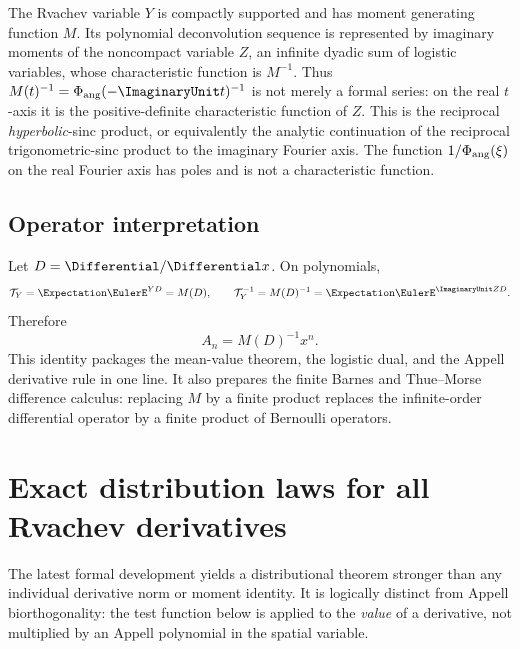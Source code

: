 \begin{resultbox}
The Rvachev variable $Y$ is compactly supported and has moment generating function $M$.  Its
polynomial deconvolution sequence is represented by imaginary moments of the noncompact variable
$Z$, an infinite dyadic sum of logistic variables, whose characteristic function is $M^{-1}$.
Thus $M(t)^{-1}=\PhiAng(-\ImaginaryUnit t)^{-1}$ is not merely a formal
series: on the real $t$-axis it is the positive-definite characteristic
function of $Z$.  This is the reciprocal \emph{hyperbolic}-sinc product, or
equivalently the analytic continuation of the reciprocal trigonometric-sinc
product to the imaginary Fourier axis.  The function $1/\Phi_{\mathrm{ang}}(\xi)$ on the
real Fourier axis has poles and is not a characteristic function.
\end{resultbox}

\subsection{Operator interpretation}

Let $D=\Differential/\Differential x$.  On polynomials,
\begin{equation}
 \mathcal T_Y=\Expectation\EulerE^{YD}=M(D),
 \qquad
 \mathcal T_Y^{-1}=M(D)^{-1}=\Expectation\EulerE^{\ImaginaryUnit ZD}.
 \label{is:p2:eq:operator-deconvolution}
\end{equation}
Therefore
\begin{equation}
 A_n=M(D)^{-1}x^n.
 \label{is:p2:eq:A-operator}
\end{equation}
This identity packages the mean-value theorem, the logistic dual, and the Appell derivative rule in
one line.  It also prepares the finite Barnes and Thue--Morse difference calculus: replacing $M$ by
a finite product replaces the infinite-order differential operator by a finite product of Bernoulli
operators.

\section{Exact distribution laws for all Rvachev derivatives}
\label{rvd:sec:derivative-distribution}

The latest formal development yields a distributional theorem stronger than
any individual derivative norm or moment identity.  It is logically distinct
from Appell biorthogonality: the test function below is applied to the
\emph{value} of a derivative, not multiplied by an Appell polynomial in the
spatial variable.

